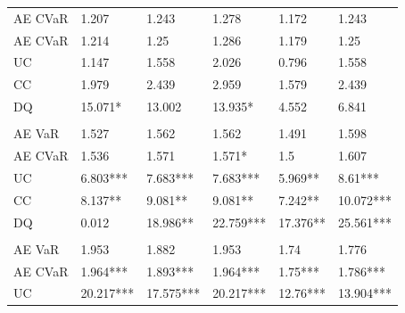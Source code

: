 \documentclass[a4paper, nobind]{templates/ociamthesis}
\begin{document}
\begin{table}
\begin{threeparttable}
\begin{tabular}[t]{llllll}
\hspace{1em}\hspace{1em}AE CVaR & 1.207 & 1.243 & 1.278 & 1.172 & 1.243\\
\hspace{1em}\hspace{1em}AE CVaR & 1.214 & 1.25 & 1.286 & 1.179 & 1.25\\
\hspace{1em}\hspace{1em}UC & 1.147 & 1.558 & 2.026 & 0.796 & 1.558\\
\hspace{1em}\hspace{1em}CC & 1.979 & 2.439 & 2.959 & 1.579 & 2.439\\
\hspace{1em}\hspace{1em}DQ & 15.071* & 13.002 & 13.935* & 4.552 & 6.841\\
\addlinespace[0.3em]
\multicolumn{6}{l}{\textbf{Panel D: T}}\\
\hspace{1em}\hspace{1em}AE VaR & 1.527 & 1.562 & 1.562 & 1.491 & 1.598\\
\hspace{1em}\hspace{1em}AE CVaR & 1.536 & 1.571 & 1.571* & 1.5 & 1.607\\
\hspace{1em}\hspace{1em}UC & 6.803*** & 7.683*** & 7.683*** & 5.969** & 8.61***\\
\hspace{1em}\hspace{1em}CC & 8.137** & 9.081** & 9.081** & 7.242** & 10.072***\\
\hspace{1em}\hspace{1em}DQ & 0.012 & 18.986** & 22.759*** & 17.376** & 25.561***\\
\addlinespace[0.3em]
\multicolumn{6}{l}{\textbf{Panel E: N}}\\
\hspace{1em}\hspace{1em}AE VaR & 1.953 & 1.882 & 1.953 & 1.74 & 1.776\\
\hspace{1em}\hspace{1em}AE CVaR & 1.964*** & 1.893*** & 1.964*** & 1.75*** & 1.786***\\
\hspace{1em}\hspace{1em}UC & 20.217*** & 17.575*** & 20.217*** & 12.76*** & 13.904***\\

\end{tabular}
\end{threeparttable}
\end{table}
\end{document}
